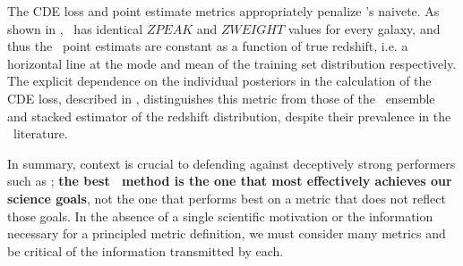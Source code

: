 The CDE loss and point estimate metrics appropriately penalize \trainz's naivete.
As shown in , \trainz ~has identical $ZPEAK$ and $ZWEIGHT$ values for every galaxy, and thus the \pz\ point estimats are constant as a function of true redshift, i.e. a horizontal line at the mode and mean of the training set distribution respectively.
The explicit dependence on the individual posteriors in the calculation of the CDE loss, described in , distinguishes this metric from those of the \pzpdf\ ensemble and stacked estimator of the redshift distribution, despite their prevalence in the \pz\ literature.

In summary, context is crucial to defending against deceptively strong performers such as \trainz; \textbf{the best \pzpdf\ method is the one that most effectively achieves our science goals}, not the one that performs best on a metric that does not reflect those goals.
In the absence of a single scientific motivation or the information necessary for a principled metric definition, we must consider many metrics and be critical of the information transmitted by each.


